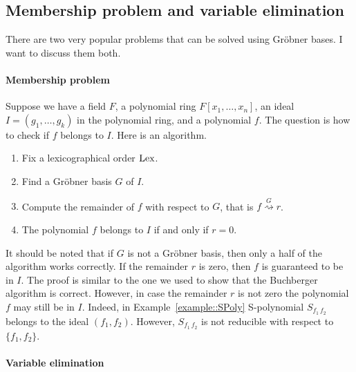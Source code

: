\subsection{Membership problem and variable elimination}

There are two very popular problems that can be solved using Gr\"obner bases.
I want to discuss them both.

\paragraph{Membership problem}

Suppose we have a field $F$, a polynomial ring $F[x_1,\ldots,x_n]$, an ideal $I = (g_1,\ldots,g_k)$ in the polynomial ring, and a polynomial $f$.
The question is how to check if $f$ belongs to $I$.
Here is an algorithm.
\begin{enumerate}
\item Fix a lexicographical order $\operatorname{Lex}$.

\item Find a Gr\"obner basis $G$ of $I$.

\item Compute the remainder of $f$ with respect to $G$, that is $f\stackrel{G}{\rightsquigarrow}r$.

\item The polynomial $f$ belongs to $I$ if and only if $r = 0$.
\end{enumerate}

It should be noted that if $G$ is not a Gr\"obner basis, then only a half of the algorithm works correctly.
If the remainder $r$ is zero, then $f$ is guaranteed to be in $I$.
The proof is similar to the one we used to show that the Buchberger algorithm is correct.
However, in case the remainder $r$ is not zero the polynomial $f$ may still be in $I$.
Indeed, in Example~\ref{example::SPoly} S-polynomial $S_{f_1\,f_2}$ belongs to the ideal $(f_1, f_2)$.
However, $S_{f_1\,f_2}$ is not reducible with respect to $\{f_1,f_2\}$.

\paragraph{Variable elimination}

